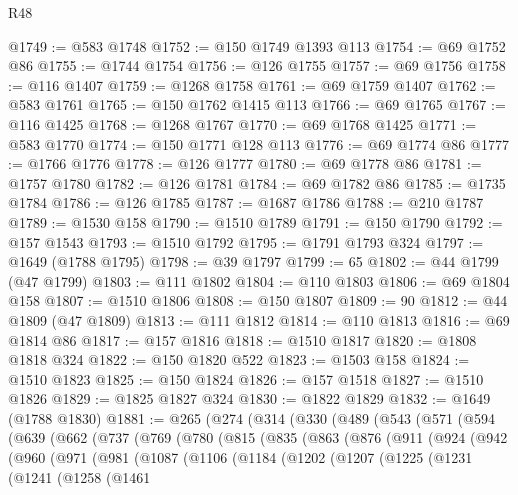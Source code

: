 \begin{lexlean}{R48}
\begin{coremodule}
@1749 := @583 @1748
@1752 := @150 @1749 @1393 @113
@1754 := @69 @1752 @86
@1755 := @1744 @1754
@1756 := @126 @1755
@1757 := @69 @1756
@1758 := @116 @1407
@1759 := @1268 @1758
@1761 := @69 @1759 @1407
@1762 := @583 @1761
@1765 := @150 @1762 @1415 @113
@1766 := @69 @1765
@1767 := @116 @1425
@1768 := @1268 @1767
@1770 := @69 @1768 @1425
@1771 := @583 @1770
@1774 := @150 @1771 @128 @113
@1776 := @69 @1774 @86
@1777 := @1766 @1776
@1778 := @126 @1777
@1780 := @69 @1778 @86
@1781 := @1757 @1780
@1782 := @126 @1781
@1784 := @69 @1782 @86
@1785 := @1735 @1784
@1786 := @126 @1785
@1787 := @1687 @1786
@1788 := @210 @1787
@1789 := @1530 @158
@1790 := @1510 @1789
@1791 := @150 @1790
@1792 := @157 @1543
@1793 := @1510 @1792
@1795 := @1791 @1793 @324
@1797 := @1649 (@1788 @1795)
@1798 := @39 @1797
@1799 := 65
@1802 := @44 @1799 (@47 @1799)
@1803 := @111 @1802
@1804 := @110 @1803
@1806 := @69 @1804 @158
@1807 := @1510 @1806
@1808 := @150 @1807
@1809 := 90
@1812 := @44 @1809 (@47 @1809)
@1813 := @111 @1812
@1814 := @110 @1813
@1816 := @69 @1814 @86
@1817 := @157 @1816
@1818 := @1510 @1817
@1820 := @1808 @1818 @324
@1822 := @150 @1820 @522
@1823 := @1503 @158
@1824 := @1510 @1823
@1825 := @150 @1824
@1826 := @157 @1518
@1827 := @1510 @1826
@1829 := @1825 @1827 @324
@1830 := @1822 @1829
@1832 := @1649 (@1788 @1830)
@1881 := @265
    (@274
      (@314
        (@330
          (@489
            (@543
              (@571
                (@594
                  (@639
                    (@662
                      (@737
                        (@769
                          (@780
                            (@815
                              (@835
                                (@863
                                  (@876
                                    (@911
                                      (@924
                                        (@942
                                          (@960
                                            (@971
                                              (@981
                                                (@1087
                                                  (@1106
                                                    (@1184
                                                      (@1202
                                                        (@1207
                                                          (@1225
                                                            (@1231
                                                              (@1241
                                                                (@1258
                                                                  (@1461

\end{coremodule}
\end{lexlean}
